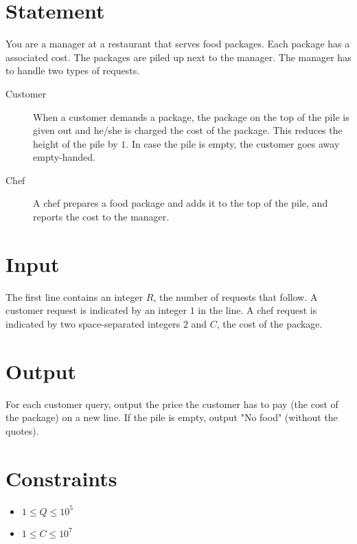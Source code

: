 \documentclass{article}
\begin{document}
\section*{Statement}

You are a manager at a restaurant that serves food packages. Each package has a associated cost. The packages are piled up next to the manager. The manager has to handle two types of requests.

\begin{description}
    \item[Customer] When a customer demands a package, the package on the top of the pile is given out and he/she is charged the cost of the package. This reduces the height of the pile by $1$. In case the pile is empty, the customer goes away empty-handed.
    
    \item[Chef] A chef prepares a food package and adds it to the top of the pile, and reports the cost to the manager.
\end{description}

\section*{Input}

The first line contains an integer $R$, the number of requests that follow. A customer request is indicated by an integer $1$ in the line. A chef request is indicated by two space-separated integers $2$ and $C$, the cost of the package.

\section*{Output}

For each customer query, output the price the customer has to pay (the cost of the package) on a new line. If the pile is empty, output "No food" (without the quotes).

\section*{Constraints}

\begin{itemize}
    \item $1 \le Q \le 10^{5}$
    \item $1 \le C \le 10^{7}$
\end{itemize}
\end{document}
